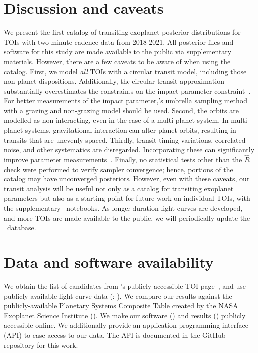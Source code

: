 \documentclass[floatfix,ApJL,twocolumn]{aastex631}
\begin{document}
\section{Discussion and caveats}\label{sec:conclusion}
We present the first catalog of transiting exoplanet posterior distributions for TOIs with two-minute cadence data from 2018-2021.
All posterior files and software for this study are made available to the public via supplementary materials.
However, there are a few caveats to be aware of when using the catalog.
First, we model \textit{all} TOIs with a circular transit model, including those non-planet dispositions.
Additionally, the circular transit approximation substantially overestimates the constraints on the impact parameter constraint~\citep
{Gilbert:2022:AJ}. For better measurements of the impact parameter,\citet{Gilbert:2022:AJ}'s umbrella sampling method with a grazing and non-grazing model should be used.
Second, the orbits are modelled as non-interacting, even in the case of a multi-planet system. In multi-planet systems, gravitational interaction can alter planet orbits, resulting in transits that are unevenly spaced.
Thirdly, transit timing variations, correlated noise, and other systematics are disregarded.
Incorporating these can significantly improve parameter measurements~\cite{Coughlin:2016:ApJS, Thompson:2018:ApJS}.
Finally, no statistical tests other than the $\hat{R}$ check were performed to verify sampler convergence; hence, portions of the catalog may have unconverged posteriors.
However, even with these caveats, our transit analysis will be useful not only as a catalog for transiting exoplanet parameters but also as a starting point for future work on individual TOIs, with the supplementary \jupyter\ notebooks.
As longer-duration light curves are developed, and more TOIs are made available to the public, we will periodically update the \tessAtlas\ database.

\section{Data and software availability}\label{sec:data}
We obtain the list of candidates from \exofop's publicly-accessible TOI page~\citep{Akeson:2013:PASP}, and use publicly-available light curve data (\mast: \mastDatabase). We compare our results against the publicly-available Planetary Systems Composite Table created by the NASA Exoplanet Science Institute (\confirmedPlanetsDb). We make our software (\atlasGit) and results (\atlasUrl) publicly accessible online. We additionally provide an application programming interface (API) to ease access to our data. The API is documented in the GitHub repository for this work.
\end{document}
